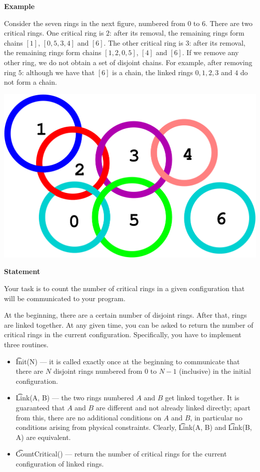 \bf{Example}

Consider the seven rings in the next figure, numbered from $0$ to $6$. There are two critical rings. One critical ring is $2$: after its removal, the remaining rings form chains $[1]$, $[0, 5, 3, 4]$ and $[6]$. The other critical ring is $3$: after its removal, the remaining rings form chains $[1, 2, 0, 5]$, $[4]$ and $[6]$. If we remove any other ring, we do not obtain a set of disjoint chains. For example, after removing ring $5$: although we have that $[6]$ is a chain, the linked rings $0, 1, 2, 3$ and $4$ do not form a chain.

\includegraphics{image_001.png}

\bf{Statement}

Your task is to count the number of critical rings in a given configuration that will be communicated to your program.

At the beginning, there are a certain number of disjoint rings. After that, rings are linked together. At any given time, you can be asked to return the number of critical rings in the current configuration. Specifically, you have to implement three routines.

\begin{itemize}
\item \t{Init(N)} --- it is called exactly once at the beginning to communicate that there are $N$ disjoint rings numbered from $0$ to $N - 1$ (inclusive) in the initial configuration.
\item \t{Link(A, B)} --- the two rings numbered $A$ and $B$ get linked together. It is guaranteed that $A$ and $B$ are different and not already linked directly; apart from this, there are no additional conditions on $A$ and $B$, in particular no conditions arising from physical constraints. Clearly, \t{Link(A, B)} and \t{Link(B, A)} are equivalent.
\item \t{CountCritical()} --- return the number of critical rings for the current configuration of linked rings.
\end{itemize}


